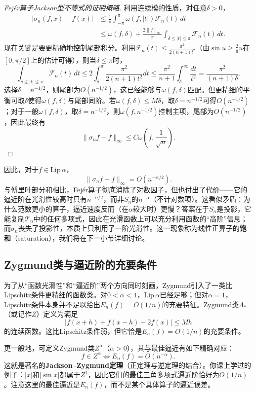 \begin{proof}[Fejér算子Jackson型不等式的证明概略]
利用连续模的性质，对任意$\delta>0$，
\[
\begin{aligned}
|\sigma_n(f,x)-f(x)|
&\le\frac1\pi\int_{-\pi}^{\pi}\omega(f,|t|)\mathcal{F}_n(t)\,dt\\
&\le\omega(f,\delta)+\frac{2\|f\|_\infty}{\pi}\int_{\delta\le|t|\le\pi}\mathcal{F}_n(t)\,dt.
\end{aligned}
\]
现在关键是要更精确地控制尾部积分。利用$\mathcal{F}_n(t)\le\frac{\pi^2}{2(n+1)t^2}$（由$\sin u\ge\frac{2}{\pi}u$在$[0,\pi/2]$上的估计可得），则当$\delta\le\pi$时，
\[
\int_{\delta\le|t|\le\pi}\mathcal{F}_n(t)\,dt\le 2\int_\delta^\pi\frac{\pi^2}{2(n+1)t^2}dt\le\frac{\pi^2}{n+1}\int_\delta^\infty\frac{dt}{t^2}=\frac{\pi^2}{(n+1)\delta}.
\]
选择$\delta=n^{-1/2}$，则尾部为$O(n^{-1/2})$，这已经能够与$\omega(f,\delta)$匹配。但更精细的平衡可取$\delta$使得$\omega(f,\delta)$与尾部同阶。若$\omega(f,\delta)\le M\delta$，取$\delta=n^{-1/2}$可得$O(n^{-1/2})$；对于一般$\omega(f,\delta)$，取$\delta=n^{-1/2}$，则$\omega(f,n^{-1/2})$控制主项，尾部为$O(n^{-1/2})$，因此最终有
\[
\|\sigma_nf-f\|_\infty\le C\omega\!\left(f,\frac1{\sqrt{n}}\right).
\]
\end{proof}

因此，对于$f\in\mathrm{Lip}\,\alpha$，
\[
\|\sigma_nf-f\|_\infty=O(n^{-\alpha/2}).
\]
与傅里叶部分和相比，Fejér算子彻底消除了对数因子，但也付出了代价——它的逼近阶在光滑性较高时只有$n^{-\alpha/2}$，而非$S_n$的$n^{-\alpha}$（不计对数项）。这看似矛盾：为什么范数更小的算子，逼近速度反而（在$\alpha$较大时）更慢？答案在于$S_n$是投影，它能复制$\mathcal{T}_n$中的任何多项式，因此在光滑函数上可以充分利用函数的“高阶”信息；而$\sigma_n$丧失了投影性，本质上只利用了一阶光滑性。这一现象称为线性正算子的\textbf{饱和}（saturation），我们将在下一小节详细讨论。

\subsection{Zygmund类与逼近阶的充要条件}

为了从“函数光滑性”和“逼近阶”两个方向同时刻画，Zygmund引入了一类比Lipschitz条件更精细的函数类。对$0<\alpha<1$，$\mathrm{Lip}\,\alpha$已经足够；但对$\alpha=1$，Lipschitz条件本身并不足以给出$E_n(f)=O(1/n)$的充要特征。Zygmund类$\Lambda_*$（或记作$Z$）定义为满足
\[
|f(x+h)+f(x-h)-2f(x)|\le Mh
\]
的连续函数。这比Lipschitz条件弱，但它恰是$E_n(f)=O(1/n)$的充要条件。

更一般地，可定义Zygmund类$Z^\alpha$（$\alpha>0$），其与最佳逼近有如下精确对应：
\[
f\in Z^\alpha\iff E_n(f)=O(n^{-\alpha}).
\]
这就是著名的\textbf{Jackson–Zygmund定理}（正定理与逆定理的结合）。你课上学过的例子：$|x|$和$|\sin x|$都属于$Z^1$，因此它们的最佳三角多项式逼近阶恰好为$O(1/n)$。注意这里的最佳逼近是$E_n(f)$，而不是某个具体算子的逼近误差。

